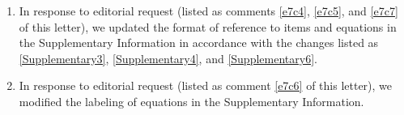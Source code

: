 \documentclass[11pt,letterpaper]{report}
\begin{document}
\begin{enumerate}[label=\textit{Ec.\arabic*}]
\begin{enumerate}[label=\textit{\ref{Supplementary4}.\roman*}]
\end{enumerate}


\item \label{Supplementary5} In response to editorial request (listed as comments \ref{e7c4}, \ref{e7c5}, and \ref{e7c7} of this letter), we updated the format of reference to items and equations in the Supplementary Information in accordance with the changes listed as \ref{Supplementary3}, \ref{Supplementary4}, and
\ref{Supplementary6}.






\item \label{Supplementary6} In response to editorial request (listed as comment \ref{e7c6} of this letter), we modified the labeling of equations in the Supplementary Information.



\end{enumerate}
\end{document}
